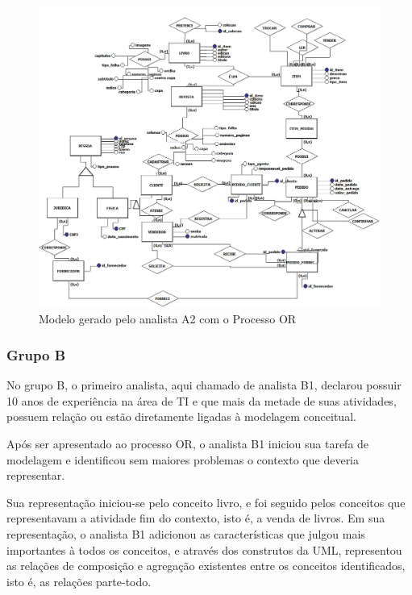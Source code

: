 \begin{figure}[!ht]
    \centering
    \includegraphics[width=\textwidth]{imagens/Modelo_002_Vanessa_Sales.jpg}
    \caption{Modelo gerado pelo analista A2 com o Processo OR}
    \label{fig:modeloA2002}
\end{figure}

\subsubsection{\hspace*{3pt} Grupo B}

No grupo B, o primeiro analista, aqui chamado de analista B1, declarou possuir 10 anos de experiência na área de TI e que mais da metade de suas atividades, possuem relação ou estão diretamente ligadas à modelagem conceitual.

Após ser apresentado ao processo OR, o analista B1 iniciou sua tarefa de modelagem e identificou sem maiores problemas o contexto que deveria representar. 

Sua representação iniciou-se pelo conceito livro, e foi seguido pelos conceitos que representavam a atividade fim do contexto, isto é, a venda de livros. Em sua representação, o analista B1 adicionou as características que julgou mais importantes à todos os conceitos, e através dos construtos da UML, representou as relações de composição e agregação existentes entre os conceitos identificados, isto é, as relações parte-todo.

